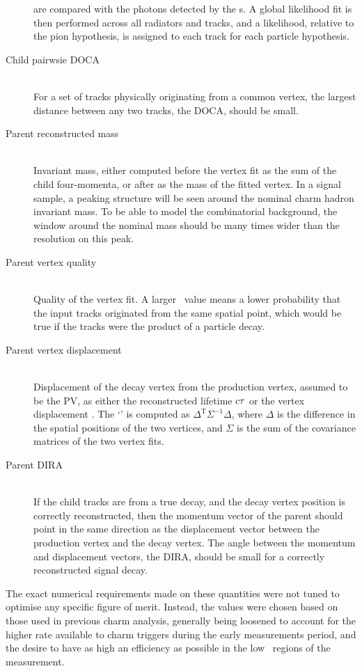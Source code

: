 \begin{description}
    are compared with the photons detected by the {\rich}s.
    A global likelihood fit is then performed across all radiators and tracks, 
    and a likelihood, relative to the pion hypothesis, is assigned to each 
    track for each particle hypothesis.
  \item[Child pairwsie \ac{DOCA}] \hfill \\
    For a set of tracks physically originating from a common vertex, the 
    largest distance between any two tracks, the \ac{DOCA}, should be small.
  \item[Parent reconstructed mass] \hfill \\
    Invariant mass, either computed before the vertex fit as the sum of the 
    child four-momenta, or after as the mass of the fitted vertex.
    In a signal sample, a peaking structure will be seen around the nominal 
    charm hadron invariant mass.
    To be able to model the combinatorial background, the window around the 
    nominal mass should be many times wider than the resolution on this peak.
  \item[Parent vertex quality] \hfill \\
    Quality of the vertex fit.
    A larger \chisq\ value means a lower probability that the input tracks 
    originated from the same spatial point, which would be true if the tracks 
    were the product of a particle decay.
  \item[Parent vertex displacement] \hfill \\
    Displacement of the decay vertex from the production vertex, assumed to be 
    the \ac{PV}, as either the reconstructed lifetime $c\tau$ or the 
    vertex displacement \chisq.
    The `\chisq' is computed as $\Delta^{\text{T}}\Sigma^{-1}\Delta$, where 
    $\Delta$ is the difference in the spatial positions of the two vertices, and 
    $\Sigma$ is the sum of the covariance matrices of the two vertex fits.
  \item[Parent \ac{DIRA}] \hfill \\
    If the child tracks are from a true decay, and the decay vertex position is 
    correctly reconstructed, then the momentum vector of the parent should 
    point in the same direction as the displacement vector between the 
    production vertex and the decay vertex.
    The angle between the momentum and displacement vectors, the \ac{DIRA}, 
    should be small for a correctly reconstructed signal decay.
\end{description}

The exact numerical requirements made on these quantities were not tuned to 
optimise any specific figure of merit.
Instead, the values were chosen based on those used in previous charm analysis, 
generally being loosened to account for the higher rate available to charm 
triggers during the early measurements period, and the desire to have as high 
an efficiency as possible in the low \pT\ regions of the measurement.

